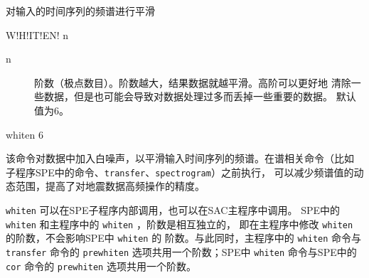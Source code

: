 \label{cmd:whiten}

对输入的时间序列的频谱进行平滑

\begin{SACSTX}
W!H!IT!EN! n
\end{SACSTX}

\begin{description}
\item [n]  阶数（极点数目）。阶数越大，结果数据就越平滑。高阶可以更好地
    清除一些数据，但是也可能会导致对数据处理过多而丢掉一些重要的数据。
    默认值为6。
\end{description}

\begin{SACDFT}
whiten 6
\end{SACDFT}

该命令对数据中加入白噪声，以平滑输入时间序列的频谱。在谱相关命令（比如
子程序SPE中的命令、\texttt{transfer}、\texttt{spectrogram}）之前执行，
可以减少频谱值的动态范围，提高了对地震数据高频操作的精度。

\texttt{whiten} 可以在SPE子程序内部调用，也可以在SAC主程序中调用。
SPE中的 \texttt{whiten} 和主程序中的 \texttt{whiten} ，阶数是相互独立的，
即在主程序中修改 \texttt{whiten} 的阶数，不会影响SPE中 \texttt{whiten} 的
阶数。与此同时，主程序中的 \texttt{whiten} 命令与 \texttt{transfer} 命令的
\texttt{prewhiten} 选项共用一个阶数；SPE中 \texttt{whiten} 命令与SPE中的
\texttt{cor} 命令的 \texttt{prewhiten} 选项共用一个阶数。
